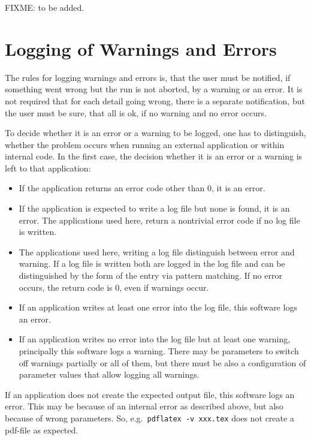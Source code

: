 \documentclass[12pt]{book}
\begin{document}
  



FIXME\@: to be added. 


\section{Logging of Warnings and Errors}\label{sec:logWarnErr}

The rules for logging warnings and errors is, 
that the user must be notified, 
if something went wrong but the run is not aborted, 
by a warning or an error. 
It is not required that for each detail going wrong, 
there is a separate notification, 
but the user must be sure, that all is ok, 
if no warning and no error occurs. 

To decide whether it is an error or a warning to be logged, 
one has to distinguish, 
whether the problem occurs when running an external application 
or within internal code. 
In the first case, the decision whether it is an error or a warning 
is left to that application: 
%
\begin{itemize}
\item 
If the application returns an error code other than 0, 
it is an error. 
\item
If the application is expected to write a log file 
but none is found, it is an error. 
The applications used here, 
return a nontrivial error code if no log file is written. 
\item
The applications used here, writing a log file 
distinguish between error and warning. 
If a log file is written both are logged in the log file 
and can be distinguished by the form of the entry via pattern matching. 
If no error occurs, the return code is 0, even if warnings occur. 
\item
If an application writes at least one error into the log file, 
this software logs an error. 
\item
If an application writes no error into the log file 
but at least one warning, principally this software logs a warning. 
There may be parameters to switch off warnings partially 
or all of them, 
but there must be also a configuration of parameter values 
that allow logging all warnings. 
\end{itemize}

If an application does not create the expected output file, 
this software logs an error. 
This may be because of an internal error as described above, 
but also because of wrong parameters. 
So, e.g.~\texttt{pdflatex -v xxx.tex} does not create a pdf-file as expected. 
\end{document}
